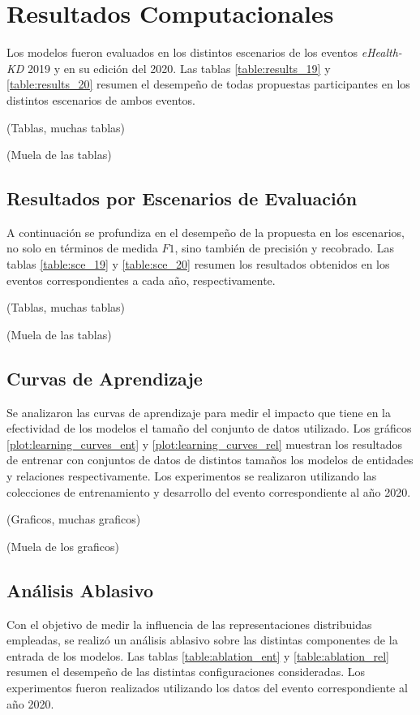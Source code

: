 \section{Resultados Computacionales}

Los modelos fueron evaluados en los distintos escenarios de los eventos \textit{eHealth-KD} 2019 y en su edición del 2020.
Las tablas  \ref{table:results_19} y \ref{table:results_20} resumen el desempeño de todas propuestas participantes en los distintos escenarios de ambos eventos. 

(Tablas, muchas tablas)

(Muela de las tablas)


\subsection{Resultados por Escenarios de Evaluación}

A continuación se profundiza en el desempeño de la propuesta en los escenarios, no solo en términos de medida $F1$, sino también de precisión y recobrado.
Las tablas \ref{table:sce_19} y \ref{table:sce_20} resumen los resultados obtenidos en los eventos correspondientes a cada año, respectivamente.

(Tablas, muchas tablas)

(Muela de las tablas)

\subsection{Curvas de Aprendizaje}

Se analizaron las curvas de aprendizaje para medir el impacto que tiene en la efectividad de los modelos el tamaño del conjunto de datos utilizado.
Los gráficos \ref{plot:learning_curves_ent} y \ref{plot:learning_curves_rel} muestran los resultados de entrenar con conjuntos de datos de distintos tamaños los modelos de entidades y relaciones respectivamente.
Los experimentos se realizaron utilizando las colecciones de entrenamiento y desarrollo del evento correspondiente al año 2020.

(Graficos, muchas graficos)

(Muela de los graficos)

\subsection{Análisis Ablasivo}

Con el objetivo de medir la influencia de las representaciones distribuidas empleadas, se realizó un análisis ablasivo sobre las distintas componentes de la entrada de los modelos.
Las tablas \ref{table:ablation_ent} y \ref{table:ablation_rel} resumen el desempeño de las distintas configuraciones consideradas.
Los experimentos fueron realizados utilizando los datos del evento correspondiente al año 2020.

